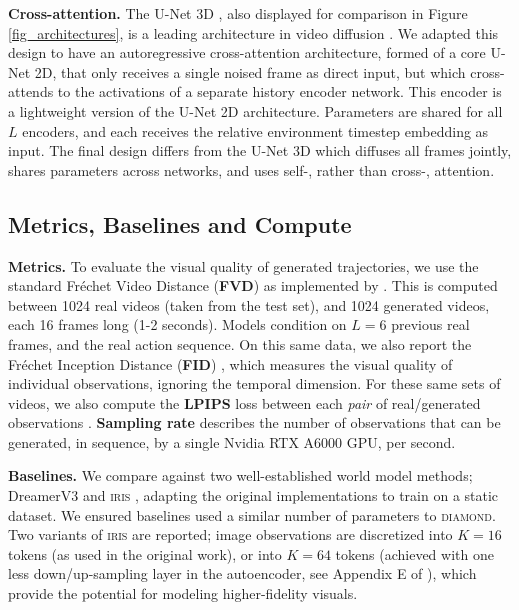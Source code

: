 \textbf{Cross-attention.} 
The U-Net 3D \citep{unet3d}, also displayed for comparison in Figure \ref{fig_architectures}, is a leading architecture in video diffusion \citep{ho2022video}. We adapted this design to have an autoregressive cross-attention architecture, formed of a core U-Net 2D, that only receives a single noised frame as direct input, but which cross-attends to the activations of a separate history encoder network. This encoder is a lightweight version of the U-Net 2D architecture. Parameters are shared for all $L$ encoders, and each receives the relative environment timestep embedding as input.
The final design differs from the U-Net 3D which diffuses all frames jointly, shares parameters across networks, and uses self-, rather than cross-, attention.

\subsection{Metrics, Baselines and Compute}
\textbf{Metrics.}
To evaluate the visual quality of generated trajectories, we use the standard Fréchet Video Distance (\textbf{FVD}) \citep{unterthiner2018towards} as implemented by \citet{skorokhodov2022stylegan}. This is computed between 1024 real videos (taken from the test set), and 1024 generated videos, each 16 frames long (1-2 seconds). Models condition on $L=6$ previous real frames, and the real action sequence. On this same data, we also report the Fréchet Inception Distance (\textbf{FID}) \citep{heusel2017gans}, which measures the visual quality of individual observations, ignoring the temporal dimension. For these same sets of videos, we also compute the \textbf{LPIPS} loss \citep{zhang2018lpips} between each \textit{pair} of real/generated observations \citep{yan2023teco}.
\textbf{Sampling rate} describes the number of observations that can be generated, in sequence, by a single Nvidia RTX A6000 GPU, per second.

\textbf{Baselines.}
We compare against two well-established world model methods; DreamerV3 \citep{hafner2023dreamerv3} and \textsc{iris} \citep{iris2023}, adapting the original implementations to train on a static dataset. We ensured baselines used a similar number of parameters to \textsc{diamond}. Two variants of \textsc{iris} are reported; image observations are discretized into $K=16$ tokens (as used in the original work), or into $K=64$ tokens (achieved with one less down/up-sampling layer in the autoencoder, see Appendix E of \citet{iris2023}), which provide the potential for modeling higher-fidelity visuals. 


